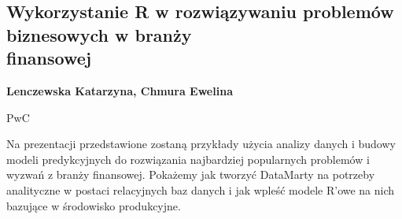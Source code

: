 \documentclass[\main/boa.tex]{subfiles}
\begin{document}
\subsection{Wykorzystanie R w rozwiązywaniu problemów biznesowych w branży \\finansowej}

\begin{minipage}{0.915\textwidth}
	\centering
  {\bf {} Lenczewska Katarzyna,  Chmura Ewelina}
\end{minipage}


\begin{affiliations}
\begin{minipage}{0.915\textwidth}
\centering
PwC \\[-2pt]
\end{minipage}
\end{affiliations}

\vskip 0.3cm

  Na prezentacji przedstawione zostaną przykłady użycia analizy danych i budowy modeli predykcyjnych do rozwiązania najbardziej popularnych problemów i wyzwań z branży finansowej. Pokażemy jak tworzyć DataMarty na potrzeby analityczne w postaci relacyjnych baz danych i jak wpleść modele R'owe na nich bazujące w środowisko produkcyjne. 
\end{document}
